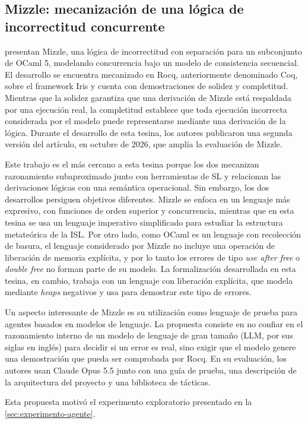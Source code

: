 \documentclass[a4paper,	11pt]{report}
\begin{document}
\subsection*{Mizzle: mecanización de una lógica de incorrectitud concurrente}
\citet{mizzle} presentan Mizzle, una lógica de incorrectitud con separación para un subconjunto de OCaml 5,
modelando concurrencia bajo un modelo de consistencia secuencial.
El desarrollo se encuentra mecanizado en Rocq,
anteriormente denominado Coq,
sobre el framework Iris y cuenta con demostraciones de solidez y completitud.
Mientras que la solidez garantiza que una derivación de Mizzle está respaldada por una ejecución real,
la completitud establece que toda ejecución incorrecta considerada por el modelo puede representarse mediante una derivación de la lógica.
Durante el desarrollo de esta tesina,
los autores publicaron una segunda versión del artículo,
en octubre de 2026,
que amplía la evaluación de Mizzle.

Este trabajo es el más cercano a esta tesina porque los dos mecanizan razonamiento subaproximado
junto con herramientas de SL y relacionan las derivaciones lógicas con una semántica operacional.
Sin embargo,
los dos desarrollos persiguen objetivos diferentes.
Mizzle se enfoca en un lenguaje más expresivo,
con funciones de orden superior y concurrencia,
mientras que en esta tesina se usa un lenguaje imperativo simplificado para estudiar la estructura metateórica de la ISL.
Por otro lado,
como OCaml es un lenguaje con recolección de basura,
el lenguaje considerado por Mizzle no incluye una operación de liberación de memoria explícita,
y por lo tanto los errores de tipo \emph{use after free} o \emph{double free} no forman parte de su modelo.
La formalización desarrollada en esta tesina,
en cambio,
trabaja con un lenguaje con liberación explícita,
que modela mediante \emph{heaps} negativos
y usa para demostrar este tipo de errores.

Un aspecto interesante de Mizzle es su utilización como lenguaje de prueba para agentes basados en modelos de lenguaje.
La propuesta consiste en no confiar en el razonamiento interno de un modelo de lenguaje de gran tamaño (LLM, por sus siglas en inglés)
para decidir si un error es real,
sino exigir que el modelo genere una demostración que pueda ser comprobada por Rocq.
En su evaluación,
los autores usan Claude Opus 5.5 junto con una guía de prueba,
una descripción de la arquitectura del proyecto y una biblioteca de tácticas.

Esta propuesta motivó el experimento exploratorio presentado en la \autoref{sec:experimento-agente}.
\end{document}

